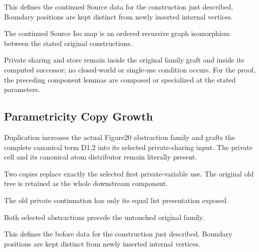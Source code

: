 This defines the continued Source data for the construction just described. Boundary positions are kept distinct from newly inserted internal vertices.
\par{}

The continued Source Iso map is an ordered recursive graph isomorphism between the stated original constructions.
\par{}

Private sharing and store remain inside the original family graft and inside its computed successor; no closed-world or single-use condition occurs.
For the proof, the preceding component lemmas are composed or specialized at the stated parameters.
\par{}

\subsection{Parametricity Copy Growth}
Duplication increases the actual Figure20 abstraction family and grafts the complete canonical term D1,2 into its selected private-sharing input. The private cell and its canonical atom distributor remain literally present.

Two copies replace exactly the selected first private-variable use. The original old tree is retained as the whole downstream component.
\par{}

The old private continuation has only its equal list presentation exposed.
\par{}

Both selected abstractions precede the untouched original family.
\par{}

This defines the before data for the construction just described. Boundary positions are kept distinct from newly inserted internal vertices.
\par{}

